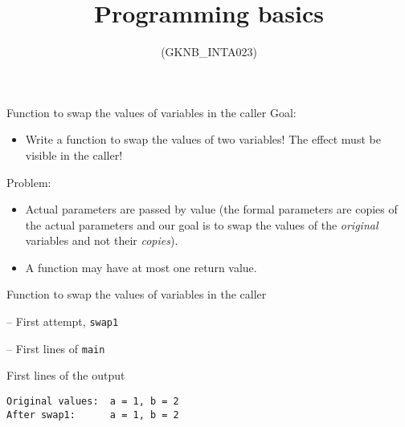 \documentclass[usenames,dvipsnames,aspectratio=169]{beamer}
\title[Lecture 8.]{Programming basics}
\subtitle{(GKNB\_INTA023)}
\begin{document}
\begin{frame}[plain]
  \titlepage
\end{frame}

\begin{frame}{Function to swap the values of variables in the caller}
  Goal:
  \begin{itemize}
    \item[] Write a function to swap the values of two variables! The effect must be visible in the caller!
  \end{itemize}
  Problem:
  \begin{itemize}
    \item Actual parameters are passed by value (the formal parameters are copies of the actual parameters and our goal is to swap the values of the \emph{original} variables and not their \emph{copies}).
    \item A function may have at most one return value.
  \end{itemize}
  \begin{exampleblock}{}
    \scriptsize
    \vspace{-.3cm}
    
    \vspace{-.3cm}
  \end{exampleblock}
\end{frame}

\begin{frame}[fragile]{Function to swap the values of variables in the caller}
  \begin{alertblock}{ -- First attempt, \texttt{swap1}}
    \scriptsize
    \vspace{-.3cm}
    
    \vspace{-.3cm}
  \end{alertblock}
  \begin{exampleblock}{ -- First lines of \texttt{main}}
    \scriptsize
    \vspace{-.3cm}
    
    \vspace{-.3cm}
  \end{exampleblock}
  \begin{block}{First lines of the output}
    \scriptsize
    \begin{verbatim}
Original values:  a = 1, b = 2
After swap1:      a = 1, b = 2
\end{verbatim}
  \end{block}
\end{frame}
\end{document}
